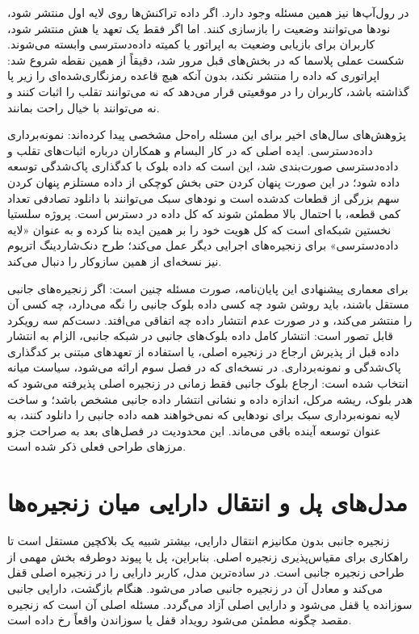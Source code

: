 در رول‌آپ‌ها نیز همین مسئله وجود دارد. اگر داده تراکنش‌ها روی لایه اول منتشر شود، نودها می‌توانند وضعیت را بازسازی کنند. اما اگر فقط یک تعهد یا هش منتشر شود، کاربران برای بازیابی وضعیت به اپراتور یا کمیته داده‌دسترسی وابسته می‌شوند. شکست عملی پلاسما که در بخش‌های قبل مرور شد، دقیقاً از همین نقطه شروع شد: اپراتوری که داده را منتشر نکند، بدون آنکه هیچ قاعده رمزنگاری‌شده‌ای را زیر پا گذاشته باشد، کاربران را در موقعیتی قرار می‌دهد که نه می‌توانند تقلب را اثبات کنند و نه می‌توانند با خیال راحت بمانند.

پژوهش‌های سال‌های اخیر برای این مسئله راه‌حل مشخصی پیدا کرده‌اند: نمونه‌برداری داده‌دسترسی. ایده اصلی که در کار البسام و همکاران درباره اثبات‌های تقلب و داده‌دسترسی صورت‌بندی شد، این است که داده بلوک با کدگذاری پاک‌شدگی توسعه داده شود؛ در این صورت پنهان کردن حتی بخش کوچکی از داده مستلزم پنهان کردن سهم بزرگی از قطعات کدشده است و نودهای سبک می‌توانند با دانلود تصادفی تعداد کمی قطعه، با احتمال بالا مطمئن شوند که کل داده در دسترس است. پروژه سلستیا نخستین شبکه‌ای است که کل هویت خود را بر همین ایده بنا کرده و به عنوان «لایه داده‌دسترسی» برای زنجیره‌های اجرایی دیگر عمل می‌کند؛ طرح دنک‌شاردینگ اتریوم نیز نسخه‌ای از همین سازوکار را دنبال می‌کند.

برای معماری پیشنهادی این پایان‌نامه، صورت مسئله چنین است: اگر زنجیره‌های جانبی مستقل باشند، باید روشن شود چه کسی داده بلوک جانبی را نگه می‌دارد، چه کسی آن را منتشر می‌کند، و در صورت عدم انتشار داده چه اتفاقی می‌افتد. دست‌کم سه رویکرد قابل تصور است: انتشار کامل داده بلوک‌های جانبی در شبکه جانبی، الزام به انتشار داده قبل از پذیرش ارجاع در زنجیره اصلی، یا استفاده از تعهدهای مبتنی بر کدگذاری پاک‌شدگی و نمونه‌برداری. در نسخه‌ای که در فصل سوم ارائه می‌شود، سیاست میانه انتخاب شده است: ارجاع بلوک جانبی فقط زمانی در زنجیره اصلی پذیرفته می‌شود که هدر بلوک، ریشه مرکل، اندازه داده و نشانی انتشار داده جانبی مشخص باشد؛ و ساخت لایه نمونه‌برداری سبک برای نودهایی که نمی‌خواهند همه داده جانبی را دانلود کنند، به عنوان توسعه آینده باقی می‌ماند. این محدودیت در فصل‌های بعد به صراحت جزو مرزهای طراحی فعلی ذکر شده است.

\section{مدل‌های پل و انتقال دارایی میان زنجیره‌ها}

زنجیره جانبی بدون مکانیزم انتقال دارایی، بیشتر شبیه یک بلاکچین مستقل است تا راهکاری برای مقیاس‌پذیری زنجیره اصلی. بنابراین، پل یا پیوند دوطرفه بخش مهمی از طراحی زنجیره جانبی است. در ساده‌ترین مدل، کاربر دارایی را در زنجیره اصلی قفل می‌کند و معادل آن در زنجیره جانبی صادر می‌شود. هنگام بازگشت، دارایی جانبی سوزانده یا قفل می‌شود و دارایی اصلی آزاد می‌گردد. مسئله اصلی آن است که زنجیره مقصد چگونه مطمئن می‌شود رویداد قفل یا سوزاندن واقعاً رخ داده است.

